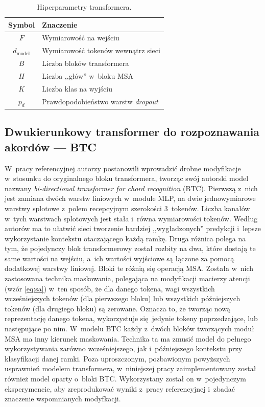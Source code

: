 \begin{table}
    \centering
    \caption{Hiperparametry transformera.}
    \label{tab:transformer_params}
    \begin{tabular}{|c|l|} \hline
        Symbol & Znaczenie \\ \hline
        $F$ & Wymiarowość na wejściu \\
        $d_{\mathrm{model}}$ & Wymiarowość tokenów wewnątrz sieci \\
        $B$ & Liczba bloków transformera \\
        $H$ & Liczba ,,głów'' w~bloku MSA \\
        $K$ & Liczba klas na wyjściu \\
        $p_d$ & Prawdopodobieństwo warstw \emph{dropout} \\ \hline
    \end{tabular}
\end{table}

\subsection{Dwukierunkowy transformer do rozpoznawania akordów --- BTC}

W~pracy referencyjnej \cite{park_bi-directional_2019} autorzy postanowili wprowadzić drobne modyfikacje w~stosunku do oryginalnego bloku transformera, tworząc swój autorski model nazwany \emph{bi-directional transformer for chord recognition} (BTC). Pierwszą z~nich jest zamiana dwóch warstw liniowych w~module MLP, na dwie jednowymiarowe warstwy splotowe z~polem recepcyjnym szerokości 3~tokenów. Liczba kanałów w~tych warstwach splotowych jest stała i~równa wymiarowości tokenów. Według autorów ma to ułatwić sieci tworzenie bardziej ,,wygładzonych'' predykcji i~lepsze wykorzystanie kontekstu otaczającego każdą ramkę. Druga różnica polega na tym, że pojedynczy blok transformerowy został rozbity na dwa, które dostają te same wartości na wejściu, a~ich wartości wyjściowe są łączone za pomocą dodatkowej warstwy liniowej. Bloki te różnią się operacją MSA.  Została w~nich zastosowana technika maskowania, polegająca na modyfikacji macierzy atencji (wzór \ref{eq:sa}) w~ten sposób, że dla danego tokena, wagi wszystkich wcześniejszych tokenów (dla pierwszego bloku) lub wszystkich późniejszych tokenów (dla drugiego bloku) są zerowane. Oznacza to, że tworząc nową reprezentację danego tokena, wykorzystuje się jedynie tokeny poprzedzające, lub następujące po nim. W~modelu BTC każdy z~dwóch bloków tworzących moduł MSA ma inny kierunek maskowania. Technika ta ma zmusić model do pełnego wykorzystywania zarówno wcześniejszego, jak i~późniejszego kontekstu przy klasyfikacji danej ramki. Poza uproszczonym, pozbawionym powyższych usprawnień modelem transformera, w~niniejszej pracy zaimplementowany został również model oparty o~bloki BTC. Wykorzystany został on w~pojedynczym eksperymencie, aby zreprodukować wyniki z~pracy referencyjnej i~zbadać znaczenie wspomnianych modyfkacji.



